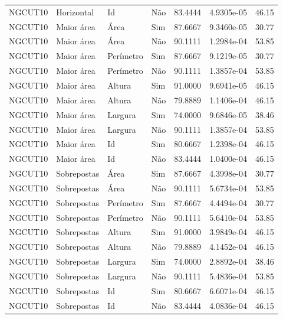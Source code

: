 \begin{tabular}{llllrrr}
NGCUT10   & Horizontal  & Id        & Não         & 83.4444      & 4.9305e-05 & 46.15    \\
NGCUT10   & Maior área  & Área      & Sim         & 87.6667      & 9.3460e-05 & 30.77    \\
NGCUT10   & Maior área  & Área      & Não         & 90.1111      & 1.2984e-04 & 53.85    \\
NGCUT10   & Maior área  & Perímetro & Sim         & 87.6667      & 9.1219e-05 & 30.77    \\
NGCUT10   & Maior área  & Perímetro & Não         & 90.1111      & 1.3857e-04 & 53.85    \\
NGCUT10   & Maior área  & Altura    & Sim         & 91.0000      & 9.6941e-05 & 46.15    \\
NGCUT10   & Maior área  & Altura    & Não         & 79.8889      & 1.1406e-04 & 46.15    \\
NGCUT10   & Maior área  & Largura   & Sim         & 74.0000      & 9.6846e-05 & 38.46    \\
NGCUT10   & Maior área  & Largura   & Não         & 90.1111      & 1.3857e-04 & 53.85    \\
NGCUT10   & Maior área  & Id        & Sim         & 80.6667      & 1.2398e-04 & 46.15    \\
NGCUT10   & Maior área  & Id        & Não         & 83.4444      & 1.0400e-04 & 46.15    \\
NGCUT10   & Sobrepostas & Área      & Sim         & 87.6667      & 4.3998e-04 & 30.77    \\
NGCUT10   & Sobrepostas & Área      & Não         & 90.1111      & 5.6734e-04 & 53.85    \\
NGCUT10   & Sobrepostas & Perímetro & Sim         & 87.6667      & 4.4494e-04 & 30.77    \\
NGCUT10   & Sobrepostas & Perímetro & Não         & 90.1111      & 5.6410e-04 & 53.85    \\
NGCUT10   & Sobrepostas & Altura    & Sim         & 91.0000      & 3.9849e-04 & 46.15    \\
NGCUT10   & Sobrepostas & Altura    & Não         & 79.8889      & 4.1452e-04 & 46.15    \\
NGCUT10   & Sobrepostas & Largura   & Sim         & 74.0000      & 2.8892e-04 & 38.46    \\
NGCUT10   & Sobrepostas & Largura   & Não         & 90.1111      & 5.4836e-04 & 53.85    \\
NGCUT10   & Sobrepostas & Id        & Sim         & 80.6667      & 6.6071e-04 & 46.15    \\
NGCUT10   & Sobrepostas & Id        & Não         & 83.4444      & 4.0836e-04 & 46.15    \\
\hline
\end{tabular}